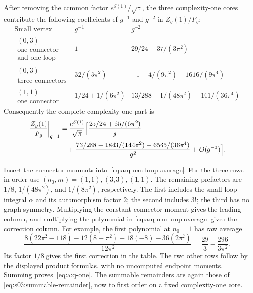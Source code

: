 \begin{prp}\label{prp:a:q-one}
After removing the common factor $e^{S(1)}/\sqrt\pi$, the three
complexity-one cores contribute the following coefficients of
$g^{-1}$ and $g^{-2}$ in $Z_g(1)/F_g$:
\begin{equation}\label{eq:a:q-one-table}
\begin{array}{c|c|c}
 \text{Small vertex}&g^{-1}&g^{-2}\\\hline
 \begin{gathered}(0,3)\\\text{one connector}\\\text{and one loop}\end{gathered}
 &1&29/24-37/(3\pi^2)\\
 \begin{gathered}(0,3)\\\text{three connectors}\end{gathered}
 &32/(3\pi^2)&-1-4/(9\pi^2)-1616/(9\pi^4)\\
 \begin{gathered}(1,1)\\\text{one connector}\end{gathered}
 &1/24+1/(6\pi^2)&13/288-1/(48\pi^2)-101/(36\pi^4)
\end{array}
\end{equation}
Consequently the complete complexity-one part is
\begin{equation}\label{eq:a:q-one}
\begin{aligned}
 \left.\frac{Z_g(1)}{F_g}\right|_{q=1}
 &=\frac{e^{S(1)}}{\sqrt\pi}\Bigl[
   \frac{25/24+65/(6\pi^2)}g\\
 &\quad+\frac{73/288-1843/(144\pi^2)-6565/(36\pi^4)}{g^2}
   +O(g^{-3})\Bigr].
\end{aligned}
\end{equation}
\end{prp}
\begin{prf}
Insert the connector moments into~\eqref{eq:a:q-one-loop-average}.
For the three rows in order use $(n_0,m)=(1,1),(3,3),(1,1)$.
The remaining prefactors are $1/8$, $1/(48\pi^2)$, and
$1/(8\pi^2)$, respectively. The first includes the small-loop integral
$\alpha$ and its automorphism factor $2$; the second includes $3!$;
the third has no graph symmetry. Multiplying the constant connector
moment gives the leading column, and multiplying the polynomial in
\eqref{eq:a:q-one-loop-average} gives the correction column.
For example, the first polynomial at $n_0=1$ has raw average
\[
 \frac{8(22\pi^2-118)-12(8-\pi^2)+18(-8)
                   -36(2\pi^2)}{12\pi^2}
 =\frac{29}{3}-\frac{296}{3\pi^2}.
\]
Its factor $1/8$ gives the first correction in the table. The two
other rows follow by the displayed product formulas, with no
uncomputed endpoint moments. Summing proves~\eqref{eq:a:q-one}.
The summable remainders are again those of
\eqref{eq:s03:summable-remainder}, now to first order on a fixed
complexity-one core.
\end{prf}

